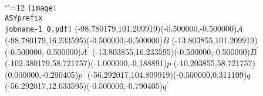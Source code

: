 \setlength{\unitlength}{1pt}
\makeatletter%
\let\ASYencoding\f@encoding%
\let\ASYfamily\f@family%
\let\ASYseries\f@series%
\let\ASYshape\f@shape%
\makeatother%
{\catcode`"=12%
\texttt{[image: \\ASYprefix\\jobname-1\_0.pdf]}%
}%
\color{ASYcolor}
\fontsize{12.000000}{14.400000}\selectfont
\usefont{\ASYencoding}{\ASYfamily}{\ASYseries}{\ASYshape}%
\ASYalign(-98.780179,101.209919)(-0.500000,-0.500000){$A$}
\color{ASYcolor}
\fontsize{12.000000}{14.400000}\selectfont
\ASYalign(-98.780179,16.233595)(-0.500000,-0.500000){$B$}
\color{ASYcolor}
\fontsize{12.000000}{14.400000}\selectfont
\ASYalign(-13.803855,101.209919)(-0.500000,-0.500000){$A^{\prime}$}
\color{ASYcolor}
\fontsize{12.000000}{14.400000}\selectfont
\ASYalign(-13.803855,16.233595)(-0.500000,-0.500000){$B^{\prime}$}
\color{ASYcolor}
\fontsize{12.000000}{14.400000}\selectfont
\ASYalign(-102.380179,58.721757)(-1.000000,-0.188891){$p$}
\color{ASYcolor}
\fontsize{12.000000}{14.400000}\selectfont
\ASYalign(-10.203855,58.721757)(0.000000,-0.290405){$p^{\prime}$}
\color{ASYcolor}
\fontsize{12.000000}{14.400000}\selectfont
\ASYalign(-56.292017,104.809919)(-0.500000,0.311109){$q$}
\color{ASYcolor}
\fontsize{12.000000}{14.400000}\selectfont
\ASYalign(-56.292017,12.633595)(-0.500000,-0.790405){$q^{\prime}$}

